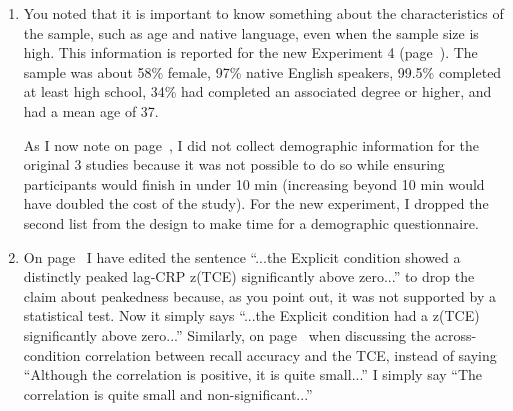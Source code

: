 \documentclass[12pt]{article}
\begin{document}
\begin{enumerate}
\item
	You noted that it is important to know something about the characteristics of the sample, such as age and native language, even when the sample size is high. This information is reported for the new Experiment 4 (page~\pageref{newexp}). The sample was about 58\% female, 97\% native English speakers, 99.5\% completed at least high school, 34\% had completed an associated degree or higher, and had a mean age of 37.

	As I now note on page~\pageref{TODO-10}, I did not collect demographic information for the original 3 studies because it was not possible to do so while ensuring participants would finish in under 10 min (increasing beyond 10 min would have doubled the cost of the study). For the new experiment, I dropped the second list from the design to make time for a demographic questionnaire. %

\item
	On page~\pageref{done-11} I have edited the sentence ``...the Explicit condition showed a distinctly peaked lag-CRP z(TCE) significantly above zero...'' to drop the claim about peakedness because, as you point out, it was not supported by a statistical test. Now it simply says ``...the Explicit condition had a z(TCE) significantly above zero...''
	Similarly, on page~\pageref{done-12} when discussing the across-condition correlation between recall accuracy and the TCE, instead of saying ``Although the correlation is positive, it is quite small...'' I simply say ``The correlation is quite small and non-significant...'' 


\end{enumerate}
\end{document}
